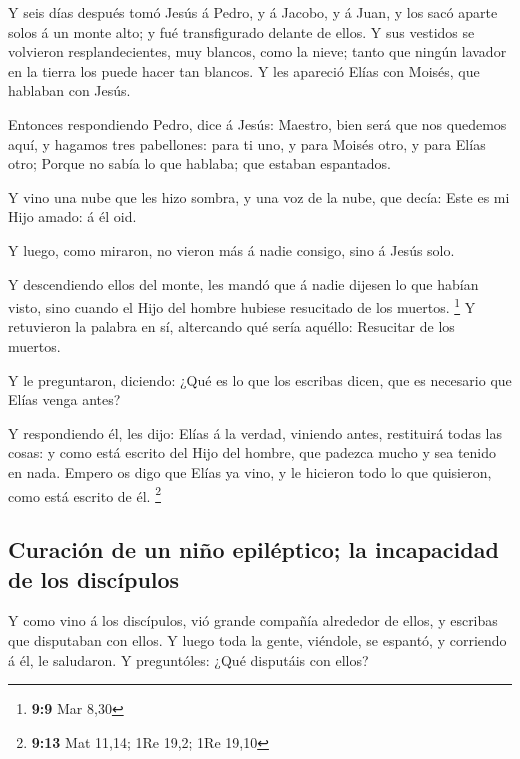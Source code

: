  Y seis días después tomó Jesús á Pedro, y á Jacobo, y á
Juan, y los sacó aparte solos á un monte alto; y fué transfigurado
delante de ellos.  Y sus vestidos se volvieron
resplandecientes, muy blancos, como la nieve; tanto que ningún lavador
en la tierra los puede hacer tan blancos.  Y les apareció
Elías con Moisés, que hablaban con Jesús.

 Entonces respondiendo Pedro, dice á Jesús: Maestro, bien
será que nos quedemos aquí, y hagamos tres pabellones: para ti uno, y
para Moisés otro, y para Elías otro;  Porque no sabía lo
que hablaba; que estaban espantados.

 Y vino una nube que les hizo sombra, y una voz de la
nube, que decía: Este es mi Hijo amado: á él oid.

 Y luego, como miraron, no vieron más á nadie consigo,
sino á Jesús solo.

 Y descendiendo ellos del monte, les mandó que á nadie
dijesen lo que habían visto, sino cuando el Hijo del hombre hubiese
resucitado de los muertos. \footnote{\textbf{9:9} Mar 8,30}
 Y retuvieron la palabra en sí, altercando qué sería
aquéllo: Resucitar de los muertos.

 Y le preguntaron, diciendo: ¿Qué es lo que los escribas
dicen, que es necesario que Elías venga antes?

 Y respondiendo él, les dijo: Elías á la verdad, viniendo
antes, restituirá todas las cosas: y como está escrito del Hijo del
hombre, que padezca mucho y sea tenido en nada.  Empero
os digo que Elías ya vino, y le hicieron todo lo que quisieron, como
está escrito de él. \footnote{\textbf{9:13} Mat 11,14; 1Re 19,2; 1Re
  19,10}

\hypertarget{curaciuxf3n-de-un-niuxf1o-epiluxe9ptico-la-incapacidad-de-los-discuxedpulos}{%
\subsection{Curación de un niño epiléptico; la incapacidad de los
discípulos}\label{curaciuxf3n-de-un-niuxf1o-epiluxe9ptico-la-incapacidad-de-los-discuxedpulos}}

 Y como vino á los discípulos, vió grande compañía
alrededor de ellos, y escribas que disputaban con ellos. 
Y luego toda la gente, viéndole, se espantó, y corriendo á él, le
saludaron.  Y preguntóles: ¿Qué disputáis con ellos?


